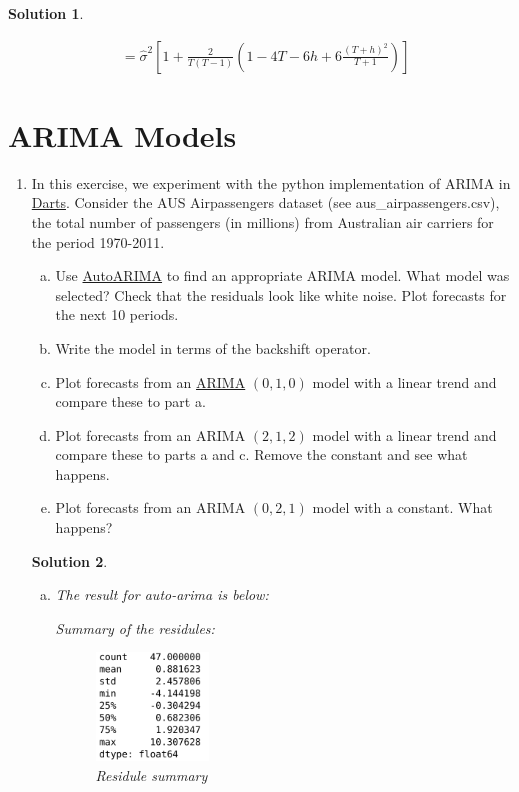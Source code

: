 \documentclass[a4paper,UTF8]{article}
\numberwithin{equation}{section}
\newtheorem*{mySol}{Solution}
\begin{document}
\begin{enumerate}
\begin{mySol}
\begin{enumerate}[a.]
\begin{align*}
            &= \hat{\sigma}^2\left[1+\frac{2}{T(T-1)}\left(1-4 T-6 h+6 \frac{(T+h)^2}{T+1}\right)\right]
         \end{align*}
     \end{enumerate}
 \end{mySol}
\end{enumerate}
 \section{ARIMA Models}
 \begin{enumerate}
 	\item In this exercise, we experiment with the python implementation of ARIMA in \href{https://unit8co.github.io/darts/README.html}{Darts}. Consider the AUS Airpassengers dataset (see aus\_airpassengers.csv), the total number of passengers (in millions) from Australian air carriers for the period 1970-2011.
 	\begin{enumerate}[a.]
 		\item Use \href{https://unit8co.github.io/darts/generated_api/darts.models.forecasting.auto_arima.html}{AutoARIMA} to find an appropriate ARIMA model. What model was selected? Check that the residuals look like white noise. Plot forecasts for the next 10 periods.
 		\item Write the model in terms of the backshift operator.
 		\item Plot forecasts from an \href{https://unit8co.github.io/darts/generated_api/darts.models.forecasting.arima.html?highlight=arima#arima}{ARIMA} $(0,1,0)$ model with a linear trend and compare these to part a.
 		\item Plot forecasts from an ARIMA $(2,1,2)$ model with a linear trend and compare these to parts a and c. Remove the constant and see what happens.
 		\item  Plot forecasts from an ARIMA $(0,2,1)$ model with a constant. What happens?
 	\end{enumerate}
 \begin{mySol}
 	\begin{enumerate}[a.]
         \item The result for auto-arima is below:
            
            Summary of the residules:
            \begin{figure}[htbp]
                \centering
                \includegraphics[width=0.3\textwidth]{summary}
                \caption{Residule summary}
            \end{figure}


\end{enumerate}
\end{mySol}
\end{enumerate}
\end{document}
